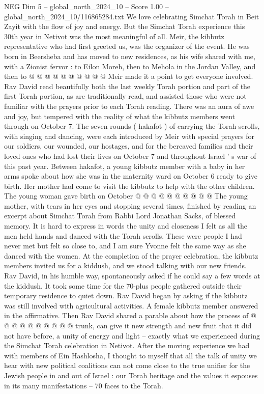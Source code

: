 \begin{textsample}{NEG Dim 5 – global\_north\_2024\_10 – Score 1.00 – global\_north\_2024\_10/116865284.txt}
We love celebrating Simchat Torah in Beit Zayit with the flow of joy and energy.
But the Simchat Torah experience this 30th year in Netivot was the most meaningful of all.
Meir, the kibbutz representative who had first greeted us, was the organizer of the event.
He was born in Beersheba and has moved to new residences, as his wife shared with me, with a Zionist fervor : to Eilon Moreh, then to Mehola in the Jordan Valley, and then to @ @ @ @ @ @ @ @ @ @ Meir made it a point to get everyone involved.
Rav David read beautifully both the last weekly Torah portion and part of the first Torah portion, as are traditionally read, and assisted those who were not familiar with the prayers prior to each Torah reading.
There was an aura of awe and joy, but tempered with the reality of what the kibbutz members went through on October 7.
The seven rounds ( hakafot ) of carrying the Torah scrolls, with singing and dancing, were each introduced by Meir with special prayers for our soldiers, our wounded, our hostages, and for the bereaved families and their loved ones who had lost their lives on October 7 and throughout Israel ' s war of this past year.
Between hakafot, a young kibbutz member with a baby in her arms spoke about how she was in the maternity ward on October 6 ready to give birth.
Her mother had come to visit the kibbutz to help with the other children.
The young woman gave birth on October @ @ @ @ @ @ @ @ @ @ The young mother, with tears in her eyes and stopping several times, finished by reading an excerpt about Simchat Torah from Rabbi Lord Jonathan Sacks, of blessed memory.
It is hard to express in words the unity and closeness I felt as all the men held hands and danced with the Torah scrolls.
These were people I had never met but felt so close to, and I am sure Yvonne felt the same way as she danced with the women.
At the completion of the prayer celebration, the kibbutz members invited us for a kiddush, and we stood talking with our new friends.
Rav David, in his humble way, spontaneously asked if he could say a few words at the kiddush.
It took some time for the 70-plus people gathered outside their temporary residence to quiet down.
Rav David began by asking if the kibbutz was still involved with agricultural activities.
A female kibbutz member answered in the affirmative.
Then Rav David shared a parable about how the process of @ @ @ @ @ @ @ @ @ @ trunk, can give it new strength and new fruit that it did not have before, a unity of energy and light -- exactly what we experienced during the Simchat Torah celebration in Netivot.
After the moving experience we had with members of Ein Hashlosha, I thought to myself that all the talk of unity we hear with new political coalitions can not come close to the true unifier for the Jewish people in and out of Israel : our Torah heritage and the values it espouses in its many manifestations -- 70 faces to the Torah.

\end{textsample}
